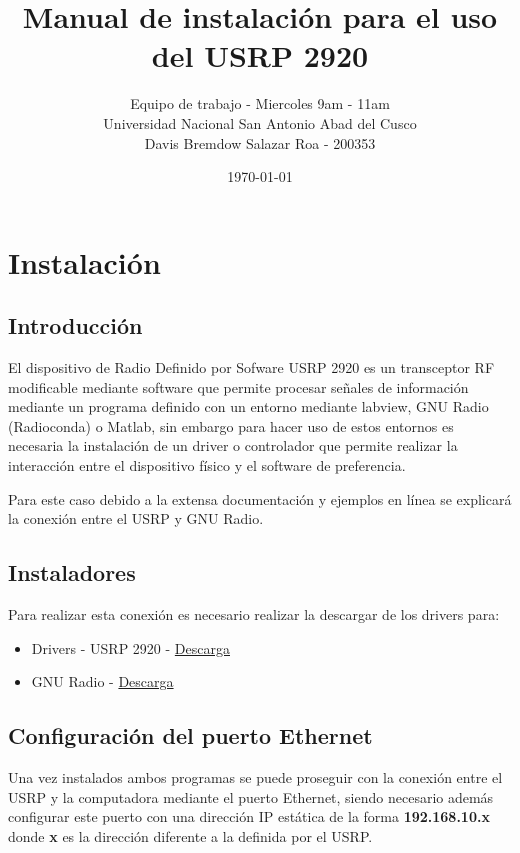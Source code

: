 \documentclass[12pt]{report}
\title{Manual de instalación para el uso del USRP 2920}
\author{Equipo de trabajo - Miercoles 9am - 11am \\ Universidad Nacional San Antonio Abad del Cusco \\ Davis Bremdow Salazar Roa - 200353}
\date{\today}
\begin{document}
	
	\maketitle
	
	\chapter{Instalación}
	
	\section{Introducción}
	El dispositivo de Radio Definido por Sofware USRP 2920 es un transceptor RF modificable mediante software que permite procesar señales de información mediante un programa definido con un entorno mediante labview, GNU Radio (Radioconda) o Matlab, sin embargo para hacer uso de estos entornos es necesaria la instalación de un driver o controlador que permite realizar la interacción entre el dispositivo físico y el software de preferencia.
	
	Para este caso debido a la extensa documentación y ejemplos en línea se explicará la conexión entre el USRP y GNU Radio.
	
	\section{Instaladores}
	Para realizar esta conexión es necesario realizar la descargar de los drivers para:
	\begin{itemize}
		\item Drivers - USRP 2920 - \href{https://files.ettus.com/binaries/uhd/latest_stable/4.8.0.0/}{Descarga}
		\item GNU Radio - \href{https://github.com/gnuradio/gnuradio/releases}{Descarga}
	\end{itemize}
	

	
	\section{Configuración del puerto Ethernet}
	Una vez instalados ambos programas se puede proseguir con la conexión entre el USRP y la computadora mediante el puerto Ethernet, siendo necesario además configurar este puerto con una dirección IP estática de la forma \textbf{192.168.10.x} donde \textbf{x} es la dirección diferente a la definida por el USRP.
	\newpage
	
\end{document}
